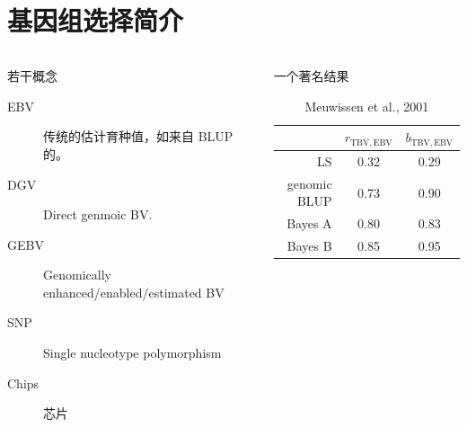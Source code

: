 \documentclass[serif,aspectratio=169]{beamer}
\begin{document}
\section{基因组选择简介}
\begin{frame}
  \begin{columns}
    \begin{column}{.5\textwidth}
      \begin{block}{若干概念}
        \begin{description}
        \item [EBV] 传统的估计育种值，如来自 BLUP 的。
        \item [DGV] Direct genmoic BV.
        \item [GEBV] Genomically enhanced/enabled/estimated BV
        \item [SNP] Single nucleotype polymorphism
        \item [Chips] 芯片
        \end{description}
      \end{block}
    \end{column}

    \pause
    \begin{column}{.5\textwidth}
      \begin{block}{一个著名结果}
        \begin{table}
          \caption{Meuwissen et al., 2001}
          \begin{tabular}{rcc}
            & $r_{\mathrm{TBV,EBV}}$ & $b_{\mathrm{TBV,EBV}}$\\\hline
            LS & 0.32 & 0.29\\
            genomic BLUP & 0.73 & 0.90\\
            Bayes A & 0.80 & 0.83\\
            Bayes B & 0.85 & 0.95
          \end{tabular}
        \end{table}
      \end{block}
    \end{column}
  \end{columns}
\end{frame}
\end{document}
